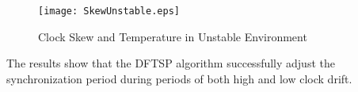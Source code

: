 \documentclass[Main]{subfiles}
\begin{document}
			\begin{figure}[H]
				\centering
				\texttt{[image: SkewUnstable.eps]}
				\caption{Clock Skew and Temperature in Unstable Environment}
				\label{fig:SkewunStable}
			\end{figure}

			The results show that the DFTSP algorithm successfully adjust the synchronization period during periods of both high and low clock drift.  

	

\end{document}
